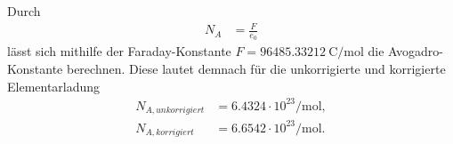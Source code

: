 Durch
\begin{align*}
        N_A&= \frac{F}{e_0}
\end{align*}
lässt sich mithilfe der Faraday-Konstante $F=\qty{96485.33212}{\coulomb\per\mol}$\cite{Faraday}
die Avogadro-Konstante berechnen.
Diese lautet demnach für die unkorrigierte und korrigierte Elementarladung
\begin{align*}
        N_{A,unkorrigiert}&= 6.4324\cdot 10^{23} \unit{\per\mol},\\  
        N_{A,korrigiert}&= 6.6542\cdot 10^{23} \unit{\per\mol}.      
\end{align*}